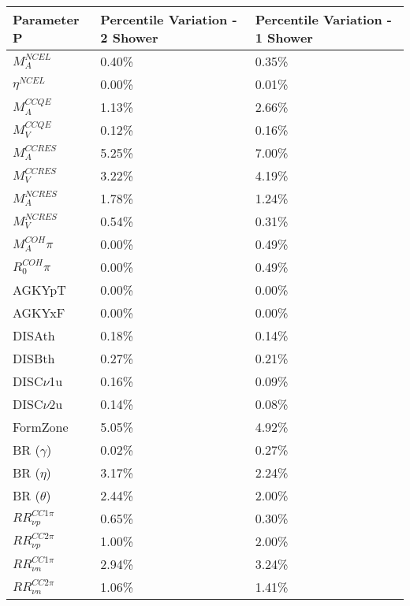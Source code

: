 \begin{table*}
\centering
{}
 \begin{tabular}{| l | l | l |}
 \hline
  Parameter P & Percentile Variation - 2 Shower & Percentile Variation - 1 Shower  \\ [0.1ex] \hline
$M_A^{NCEL}$ &  0.40\% & 0.35\% \\
$\eta^{NCEL}$  & 0.00\% & 0.01\% \\
$M_A^{CCQE}$  & 1.13\% & 2.66\% \\
$M_V^{CCQE}$  & 0.12\% & 0.16\% \\
$M_A^{CCRES}$  & 5.25\% & 7.00\% \\
$M_V^{CCRES}$  & 3.22\% & 4.19\% \\
$M_A^{NCRES}$  & 1.78\% & 1.24\% \\
$M_V^{NCRES}$  & 0.54\% & 0.31\%\\
$M_A^{COH}\pi$  & 0.00\% & 0.49\% \\
$R_0^{COH}\pi$  & 0.00\% & 0.49\%\\

AGKYpT & 0.00\% & 0.00\% \\
AGKYxF & 0.00\% & 0.00\% \\
DISAth & 0.18\% & 0.14\% \\
DISBth & 0.27\% & 0.21\% \\
DISC$\nu$1u & 0.16\% & 0.09\% \\
DISC$\nu$2u & 0.14\% & 0.08\% \\ \hline

FormZone  & 5.05\% & 4.92\% \\
BR ($\gamma$)  & 0.02\% & 0.27\% \\
BR ($\eta$)  & 3.17\% & 2.24\% \\
BR ($\theta$)  & 2.44\% & 2.00\% \\ \hline

$RR_{\nu p}^{CC1\pi}$ & 0.65\% & 0.30\% \\ 
$RR_{\nu p}^{CC2\pi}$ & 1.00\% & 2.00\% \\
$RR_{\nu n}^{CC1\pi}$ & 2.94\% & 3.24\% \\ 
$RR_{\nu n}^{CC2\pi}$ & 1.06\% & 1.41\% \\ \hline


\end{tabular}
\end{table*}
